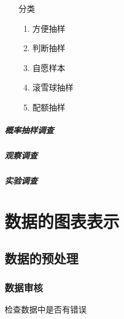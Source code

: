 \documentclass[UTF8,10pt]{book}
\begin{document}
            \begin{itemize}
                \item [分类] {
                    \begin{enumerate}
                        \item 方便抽样
                        \item 判断抽样
                        \item 自愿样本
                        \item 滚雪球抽样
                        \item 配额抽样
                                        
                    \end{enumerate}
                }
            \end{itemize}

        \paragraph{概率抽样调查}
        \paragraph{观察调查}
        \paragraph{实验调查}

        


\clearpage
\chapter{数据的图表表示}



    \section{数据的预处理}
    \subsection{数据审核}
        检查数据中是否有错误
        
\end{document}
